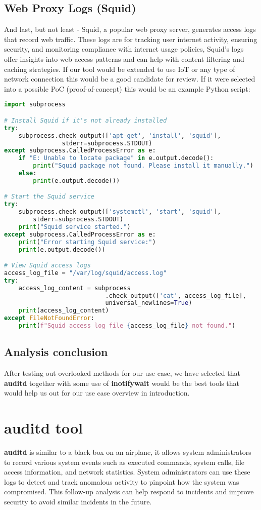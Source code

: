 \documentclass{VUMIFPSmagistrinis}
\begin{document}
\subsection{Web Proxy Logs (Squid)}
And last, but not least - Squid, a popular web proxy server, generates access logs that record web traffic. These logs are for tracking user internet activity, ensuring security, and monitoring compliance with internet usage policies, Squid's logs offer insights into web access patterns and can help with content filtering and caching strategies. If our tool would be extended to use IoT or any type of network connection this would be a good candidate for review. If it were selected into a possible PoC (proof-of-concept) this would be an example Python script:
\begin{lstlisting}[language=Python]
import subprocess

# Install Squid if it's not already installed
try:
    subprocess.check_output(['apt-get', 'install', 'squid'], 
                stderr=subprocess.STDOUT)
except subprocess.CalledProcessError as e:
    if "E: Unable to locate package" in e.output.decode():
        print("Squid package not found. Please install it manually.")
    else:
        print(e.output.decode())

# Start the Squid service
try:
    subprocess.check_output(['systemctl', 'start', 'squid'], 
        stderr=subprocess.STDOUT)
    print("Squid service started.")
except subprocess.CalledProcessError as e:
    print("Error starting Squid service:")
    print(e.output.decode())

# View Squid access logs
access_log_file = "/var/log/squid/access.log"
try:
    access_log_content = subprocess
                            .check_output(['cat', access_log_file], 
                            universal_newlines=True)
    print(access_log_content)
except FileNotFoundError:
    print(f"Squid access log file {access_log_file} not found.")
\end{lstlisting}

\subsection{Analysis conclusion}
After testing out overlooked methods for our use case, we have selected that \textbf{auditd} together with some use of \textbf{inotifywait} would be the best tools that would help us out for our use case overview in introduction.

\section{auditd tool}
\textbf{auditd} is similar to a black box on an airplane, it allows system administrators to record various system events such as executed commands, system calls, file access information, and network statistics. System administrators can use these logs to detect and track anomalous activity to pinpoint how the system was compromised. This follow-up analysis can help respond to incidents and improve security to avoid similar incidents in the future.
\end{document}
